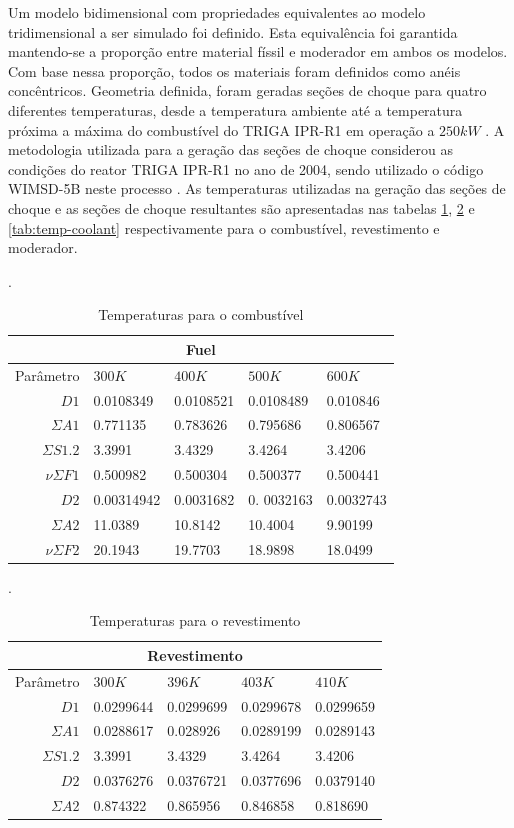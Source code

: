 Um modelo bidimensional com propriedades equivalentes ao modelo tridimensional a ser simulado
foi definido. Esta equivalência foi garantida mantendo-se a proporção entre material
físsil e moderador em ambos os modelos. Com base nessa proporção,
todos os materiais foram definidos como anéis concêntricos. Geometria definida,
foram geradas seções de choque para quatro diferentes temperaturas, desde
a temperatura ambiente até a temperatura próxima a máxima do combustível do TRIGA IPR-R1 em operação
a $250 kW$ \cite{Veloso2005}. A metodologia utilizada para a geração
das seções de choque considerou as condições do reator TRIGA IPR-R1 no
ano de 2004, sendo utilizado o código WIMSD-5B neste processo \cite{Reis2015}.
As temperaturas utilizadas na geração das seções de choque
e as seções de choque resultantes são apresentadas nas tabelas \ref{tab:temp-fuel},
\ref{tab:temp-cladding} e \ref{tab:temp-coolant} respectivamente para o combustível, revestimento
e moderador.


\begin{table}[htb]
  \caption[Temperaturas para combustível.]{Temperaturas para o combustível}.
  \label{tab:temp-fuel}
  \begin{tabular}{r l l l l}
  \multicolumn{5}{c}{Fuel} \\
  \hline
  Parâmetro & $300K$ & $400K$ & $500K$ & $600K$ \\
  \hline
  $D1$ & 0.0108349 & 0.0108521 & 0.0108489 & 0.010846\\
  $\Sigma A1$ & 0.771135 & 0.783626 & 0.795686 & 0.806567\\
  $\Sigma S1.2$ & 3.3991 & 3.4329 & 3.4264 & 3.4206\\
  $\nu \Sigma F1$ & 0.500982 & 0.500304 & 0.500377 & 0.500441\\
  \hline
  $D2$ & 0.00314942 & 0.0031682 & 0. 0032163 & 0.0032743 \\
  $\Sigma A2$ & 11.0389 & 10.8142 & 10.4004 & 9.90199\\
  $\nu \Sigma F2$ & 20.1943 & 19.7703 & 18.9898 & 18.0499\\
  \hline
\end{tabular}
\end{table}

\begin{table}[htb]
  \caption[Temperaturas para o revestimento.]{Temperaturas para o revestimento}.
  \label{tab:temp-cladding}
  \begin{tabular}{r l l l l}
    \multicolumn{5}{c}{Revestimento} \\
    \hline
    Parâmetro & $300K$ & $396K$ & $403K$ & $410K$ \\
    \hline
    $D1$ & 0.0299644 & 0.0299699 & 0.0299678 & 0.0299659 \\
    $\Sigma A1$ & 0.0288617 & 0.028926 & 0.0289199 & 0.0289143 \\
    $\Sigma S1.2$ & 3.3991 & 3.4329 & 3.4264 & 3.4206\\
    \hline
    $D2$ & 0.0376276 & 0.0376721 & 0.0377696 & 0.0379140\\
    $\Sigma A2$ & 0.874322 & 0.865956 & 0.846858 & 0.818690\\
    \hline
  \end{tabular}
\end{table}

